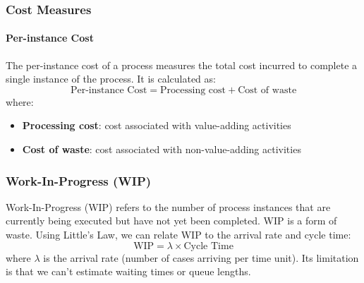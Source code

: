 \subsubsection{Cost Measures}
\paragraph{Per-instance Cost}
The per-instance cost of a process measures the total cost incurred to complete a single instance of the process.
It is calculated as:
\begin{equation}
    \text{Per-instance Cost} = \text{Processing cost} + \text{Cost of waste}
\end{equation}
where:
\begin{itemize}
    \item \textbf{Processing cost}: cost associated with value-adding activities
    \item  \textbf{Cost of waste}: cost associated with non-value-adding activities
\end{itemize}

\subsubsection{Work-In-Progress (WIP)}
Work-In-Progress (WIP) refers to the number of process instances that are currently being executed but have not yet been completed.
WIP is a form of waste. 
Using Little's Law, we can relate WIP to the arrival rate and cycle time:
\begin{equation}
    \text{WIP} = \lambda \times \text{Cycle Time}
\end{equation}
where $\lambda$ is the arrival rate (number of cases arriving per time unit).
Its limitation is that we can't estimate waiting times or queue lengths.
